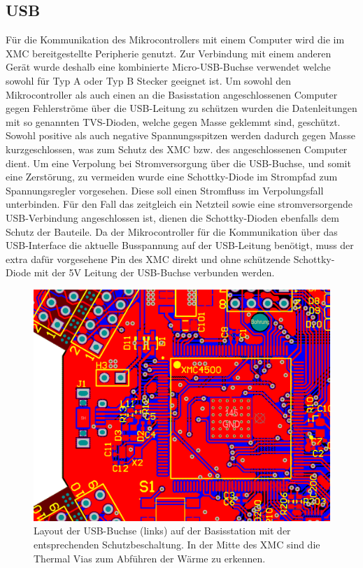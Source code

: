 \subsection{USB}
Für die Kommunikation des Mikrocontrollers mit einem Computer wird die im XMC bereitgestellte Peripherie genutzt. Zur Verbindung mit einem anderen Gerät wurde deshalb eine kombinierte Micro-USB-Buchse verwendet welche sowohl für Typ A oder Typ B Stecker geeignet ist.
Um sowohl den Mikrocontroller als auch einen an die Basisstation angeschlossenen Computer gegen Fehlerströme über die USB-Leitung zu schützen wurden die Datenleitungen mit so genannten \ac{TVS}-Dioden, welche gegen Masse geklemmt sind, geschützt. Sowohl positive als auch negative Spannungsspitzen werden dadurch gegen Masse kurzgeschlossen, was zum Schutz des XMC bzw. des angeschlossenen Computer dient. Um eine Verpolung bei Stromversorgung über die USB-Buchse, und somit eine Zerstörung, zu vermeiden wurde eine Schottky-Diode im Strompfad zum Spannungsregler vorgesehen. Diese soll einen Stromfluss im Verpolungsfall unterbinden. Für den Fall das zeitgleich ein Netzteil sowie eine stromversorgende USB-Verbindung angeschlossen ist, dienen die Schottky-Dioden ebenfalls dem Schutz der Bauteile. Da der Mikrocontroller für die Kommunikation über das USB-Interface die aktuelle Busspannung auf der USB-Leitung benötigt, muss der extra dafür vorgesehene Pin des XMC direkt und ohne schützende Schottky-Diode mit der 5V Leitung der USB-Buchse verbunden werden. 
\begin{figure}[h]
\centering
\includegraphics[width=0.7\linewidth]{"Abbildungen/Aufnahmen/Bilder/Altium/USB und XMC"}
\caption{Layout der USB-Buchse (links) auf der Basisstation mit der entsprechenden Schutzbeschaltung. In der Mitte des XMC sind die Thermal Vias zum Abführen der Wärme zu erkennen.}
\label{fig:usb-und-xmc}
\end{figure}


